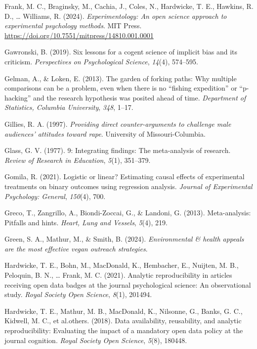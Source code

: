 \documentclass[
  man]{apa6}
\newlength{\cslhangindent}
\newenvironment{CSLReferences}[2] %
 {\begin{list}{}{%
  \setlength{\itemindent}{0pt}
  \setlength{\leftmargin}{0pt}
  \setlength{\parsep}{0pt}
  \ifodd #1
   \setlength{\leftmargin}{\cslhangindent}
   \setlength{\itemindent}{-1\cslhangindent}
  \fi
  \setlength{\itemsep}{#2\baselineskip}}}
 {\end{list}}
\begin{document}
\begin{CSLReferences}{1}{0}
Frank, M. C., Braginsky, M., Cachia, J., Coles, N., Hardwicke, T. E., Hawkins, R. D., \ldots{} Williams, R. (2024). \emph{Experimentology: An open science approach to experimental psychology methods}. MIT Press. \url{https://doi.org/10.7551/mitpress/14810.001.0001}

Gawronski, B. (2019). Six lessons for a cogent science of implicit bias and its criticism. \emph{Perspectives on Psychological Science}, \emph{14}(4), 574--595.

Gelman, A., \& Loken, E. (2013). The garden of forking paths: Why multiple comparisons can be a problem, even when there is no {``fishing expedition''} or {``p-hacking''} and the research hypothesis was posited ahead of time. \emph{Department of Statistics, Columbia University}, \emph{348}, 1--17.

Gillies, R. A. (1997). \emph{Providing direct counter-arguments to challenge male audiences' attitudes toward rape}. University of Missouri-Columbia.

Glass, G. V. (1977). 9: Integrating findings: The meta-analysis of research. \emph{Review of Research in Education}, \emph{5}(1), 351--379.

Gomila, R. (2021). Logistic or linear? Estimating causal effects of experimental treatments on binary outcomes using regression analysis. \emph{Journal of Experimental Psychology: General}, \emph{150}(4), 700.

Greco, T., Zangrillo, A., Biondi-Zoccai, G., \& Landoni, G. (2013). Meta-analysis: Pitfalls and hints. \emph{Heart, Lung and Vessels}, \emph{5}(4), 219.

Green, S. A., Mathur, M., \& Smith, B. (2024). \emph{Environmental \& health appeals are the most effective vegan outreach strategies}.

Hardwicke, T. E., Bohn, M., MacDonald, K., Hembacher, E., Nuijten, M. B., Peloquin, B. N., \ldots{} Frank, M. C. (2021). Analytic reproducibility in articles receiving open data badges at the journal psychological science: An observational study. \emph{Royal Society Open Science}, \emph{8}(1), 201494.

Hardwicke, T. E., Mathur, M. B., MacDonald, K., Nilsonne, G., Banks, G. C., Kidwell, M. C., et al.others. (2018). Data availability, reusability, and analytic reproducibility: Evaluating the impact of a mandatory open data policy at the journal cognition. \emph{Royal Society Open Science}, \emph{5}(8), 180448.


\end{CSLReferences}
\end{document}
